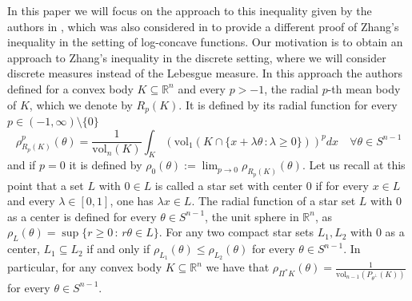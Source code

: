 \documentclass[10pt]{amsart}
\def\R{\mathbb{R}}
\def\vol{\mathrm{vol}}
\numberwithin{equation}{section}
\begin{document}
In this paper we will focus on the approach to this inequality given by the authors in \cite{GZ}, which was also considered in \cite{ABG2} to provide a different proof of Zhang's inequality in the setting of log-concave functions. Our motivation is to obtain an approach to Zhang's inequality in the discrete setting, where we will consider discrete measures instead of the Lebesgue measure. In this approach the authors defined for a convex body $K\subseteq\R^n$ and every $p>-1$, the radial $p$-th mean body of $K$, which we denote by $R_p(K)$. It is defined  by its radial function for every $p\in(-1,\infty)\setminus\{0\}$
\begin{equation}\label{eq:DefinitionRadialFuncion}
\rho_{R_p(K)}^p(\theta)=\frac{1}{\vol_n(K)}\int_K(\vol_1(K\cap\{x+\lambda\theta\,:\lambda\geq0\}))^pdx\quad\forall\theta\in S^{n-1}
\end{equation}
and if $p=0$ it is defined by $\displaystyle{\rho_0(\theta):=\lim_{p\to0}\rho_{R_p(K)}(\theta)}$. Let us recall at this point that a set $L$ with $0\in L$ is called a star set with center $0$ if for every $x\in L$ and every $\lambda\in[0,1]$, one has $\lambda x\in L$. The radial function of a star set $L$ with $0$ as a center is defined for every $\theta\in S^{n-1}$, the unit sphere in $\R^n$, as $\rho_L(\theta)=\sup\{r\geq0\,:\,r\theta\in L\}$. For any two compact star sets $L_1,L_2$ with $0$ as a center, $L_1\subseteq L_2$ if and only if $\rho_{L_1}(\theta)\leq\rho_{L_2}(\theta)$ for every $\theta\in S^{n-1}$. In particular, for any convex body $K\subseteq\R^n$ we have that $\rho_{\Pi^*K}(\theta)=\frac{1}{\vol_{n-1}(P_{\theta^\perp}(K))}$ for every $\theta\in S^{n-1}$.
\end{document}
